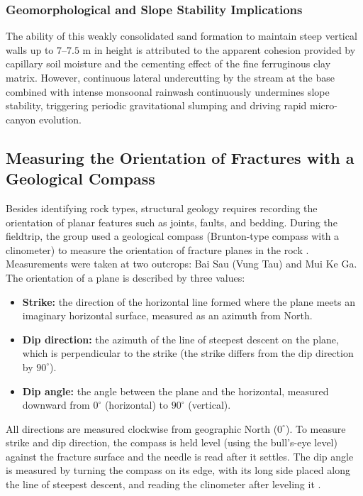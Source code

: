 \documentclass[11pt, a4paper]{article}
\begin{document}
\subsubsection{Geomorphological and Slope Stability Implications}

The ability of this weakly consolidated sand formation to maintain steep vertical walls up to $7\text{--}7.5\text{ m}$ in height is attributed to the apparent cohesion provided by capillary soil moisture and the cementing effect of the fine ferruginous clay matrix. However, continuous lateral undercutting by the stream at the base combined with intense monsoonal rainwash continuously undermines slope stability, triggering periodic gravitational slumping and driving rapid micro-canyon evolution.


\subsection{Measuring the Orientation of Fractures with a Geological Compass}
\label{subsec:compass}

Besides identifying rock types, structural geology requires recording the orientation of planar features such as joints, faults, and bedding. During the fieldtrip, the group used a geological compass (Brunton-type compass with a clinometer) to measure the orientation of fracture planes in the rock \cite{earle-structures}. Measurements were taken at two outcrops: Bai Sau (Vung Tau) and Mui Ke Ga. The orientation of a plane is described by three values:
\begin{itemize}
    \item \textbf{Strike:} the direction of the horizontal line formed where the plane meets an imaginary horizontal surface, measured as an azimuth from North.
    \item \textbf{Dip direction:} the azimuth of the line of steepest descent on the plane, which is perpendicular to the strike (the strike differs from the dip direction by $90^{\circ}$).
    \item \textbf{Dip angle:} the angle between the plane and the horizontal, measured downward from $0^{\circ}$ (horizontal) to $90^{\circ}$ (vertical).
\end{itemize}

All directions are measured clockwise from geographic North ($0^{\circ}$). To measure strike and dip direction, the compass is held level (using the bull's-eye level) against the fracture surface and the needle is read after it settles. The dip angle is measured by turning the compass on its edge, with its long side placed along the line of steepest descent, and reading the clinometer after leveling it \cite{earle-structures}.
\end{document}
